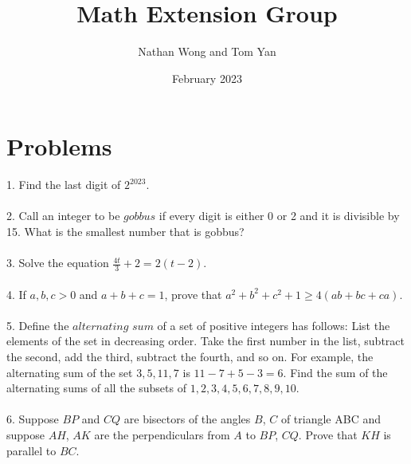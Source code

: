 \documentclass{article}
\title{Math Extension Group}
\author{Nathan Wong and Tom Yan}
\date{February 2023}
\begin{document}
\maketitle
\section*{Problems}
1. Find the last digit of $2^{2023}$. \\\\
2. Call an integer to be $gobbus$ if every digit is either 0 or 2 and it is divisible by 15. What is the smallest number that is gobbus? \\\\
3. Solve the equation $\frac{4t}{3}+2=2(t-2)$. \\\\
4. If $a,b,c > 0$ and $a+b+c=1$, prove that $a^2+b^2+c^2+1\ge4(ab+bc+ca)$.\\\\
5. Define the $alternating$ $sum$ of a set of positive integers has follows: List the elements of the set in decreasing order. Take the first number in the list, subtract the second, add the third, subtract the fourth, and so on. For example, the alternating sum of the set ${3,5,11,7}$ is $11-7+5-3=6$. Find the sum of the alternating sums of all the subsets of ${1,2,3,4,5,6,7,8,9,10}$. \\\\
6. Suppose $BP$ and $CQ$ are bisectors of the angles $B$, $C$ of triangle ABC and suppose $AH$, $AK$ are the perpendiculars from $A$ to $BP$, $CQ$. Prove that $KH$ is parallel to $BC$.
\end{document}
